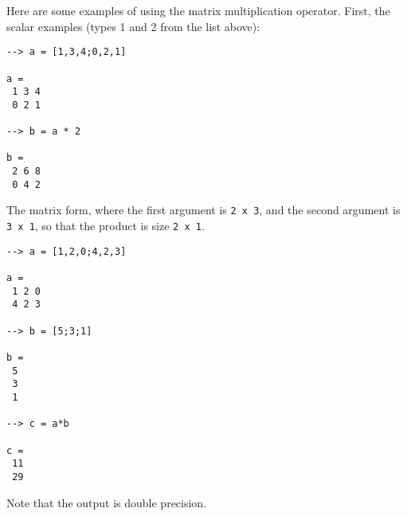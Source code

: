 Here are some examples of using the matrix multiplication operator.  First,
the scalar examples (types 1 and 2 from the list above):
\begin{verbatim}
--> a = [1,3,4;0,2,1]

a = 
 1 3 4 
 0 2 1 

--> b = a * 2

b = 
 2 6 8 
 0 4 2 
\end{verbatim}
The matrix form, where the first argument is \verb|2 x 3|, and the
second argument is \verb|3 x 1|, so that the product is size 
\verb|2 x 1|.
\begin{verbatim}
--> a = [1,2,0;4,2,3]

a = 
 1 2 0 
 4 2 3 

--> b = [5;3;1]

b = 
 5 
 3 
 1 

--> c = a*b

c = 
 11 
 29 
\end{verbatim}
Note that the output is double precision.
